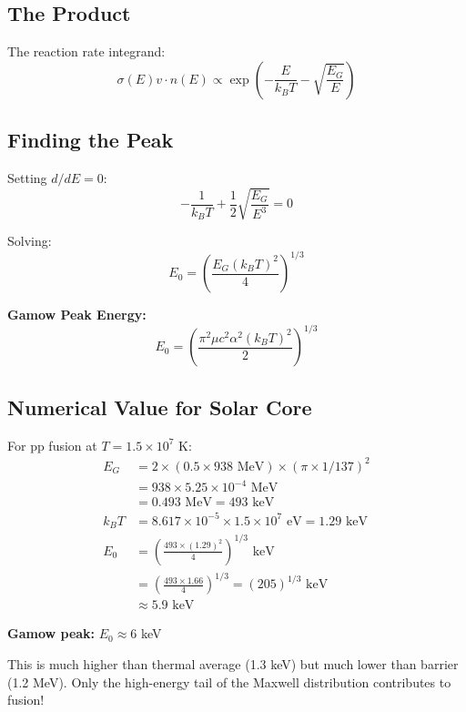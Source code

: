 \documentclass[12pt,a4paper]{article}
\newcommand{\kB}{k_B}
\begin{document}
\subsection{The Product}

The reaction rate integrand:
\begin{equation}
\sigma(E) v \cdot n(E) \propto \exp\left(-\frac{E}{\kB T} - \sqrt{\frac{E_G}{E}}\right)
\end{equation}

\subsection{Finding the Peak}

Setting $d/dE = 0$:
\begin{equation}
-\frac{1}{\kB T} + \frac{1}{2}\sqrt{\frac{E_G}{E^3}} = 0
\end{equation}

Solving:
\begin{equation}
E_0 = \left(\frac{E_G (\kB T)^2}{4}\right)^{1/3}
\end{equation}

\begin{keyresult}
\textbf{Gamow Peak Energy:}
\begin{equation}
\boxed{E_0 = \left(\frac{\pi^2 \mu c^2 \alpha^2 (\kB T)^2}{2}\right)^{1/3}}
\end{equation}
\end{keyresult}

\subsection{Numerical Value for Solar Core}

\begin{numerical}
For pp fusion at $T = 1.5 \times 10^7$ K:
\begin{align*}
E_G &= 2 \times (0.5 \times 938 \text{ MeV}) \times (\pi \times 1/137)^2 \\
&= 938 \times 5.25 \times 10^{-4} \text{ MeV} \\
&= 0.493 \text{ MeV} = 493 \text{ keV} \\[0.3cm]
\kB T &= 8.617 \times 10^{-5} \times 1.5 \times 10^7 \text{ eV} = 1.29 \text{ keV} \\[0.3cm]
E_0 &= \left(\frac{493 \times (1.29)^2}{4}\right)^{1/3} \text{ keV} \\
&= \left(\frac{493 \times 1.66}{4}\right)^{1/3} = (205)^{1/3} \text{ keV} \\
&\approx 5.9 \text{ keV}
\end{align*}

\textbf{Gamow peak:} $E_0 \approx 6$ keV

This is much higher than thermal average (1.3 keV) but much lower than barrier (1.2 MeV). Only the high-energy tail of the Maxwell distribution contributes to fusion!
\end{numerical}
\end{document}
